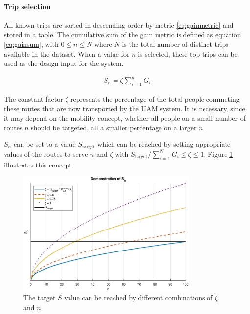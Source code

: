 \paragraph{Trip selection}

All known trips are sorted in descending order by metric \ref{eq:gainmetric} and stored in a table. The cumulative sum of the gain metric is defined as equation \ref{eq:gainsum}, with $0\leq n\leq N$ where $N$ is the total number of distinct trips available in the dataset. When a value for $n$ is selected, these top trips can be used as the design input for the system.

\begin{align} \label{eq:gainsum}
    S_n = \zeta \sum_{i=1}^{n}{G_i}
\end{align}

The constant factor $\zeta$ represents the percentage of the total people commuting these routes that are now transported by the UAM system. It is necessary, since it may depend on the mobility concept, whether all people on a small number of routes $n$ should be targeted, all a smaller percentage on a larger $n$.

$S_n$ can be set to a value $S_{\text{target}}$ which can be reached by setting appropriate values of the routes to serve $n$ and $\zeta$ with $S_{\text{target}} / \sum_{i=1}^{N}{G_i}\leq \zeta \leq 1$. Figure \ref{fig:zeta_n_demo} illustrates this concept. 

\begin{figure}
    \centering
    \includegraphics[width=0.8\textwidth]{Figures/S_nDemo.eps}
    \captionsetup{justification=centering}
    \caption{The target $S$ value can be reached by different combinations of $\zeta$ and $n$}
    \label{fig:zeta_n_demo}
\end{figure}


